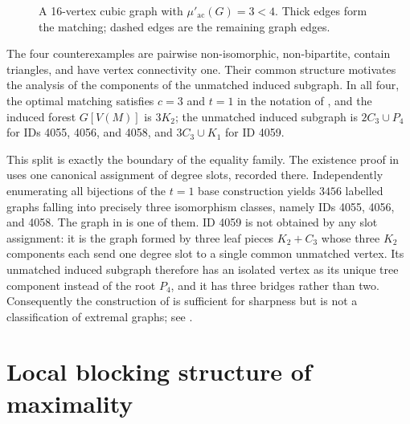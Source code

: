 \documentclass[smallextended,natbib,nospthms]{svjour3}
\theoremstyle{definition}
\theoremstyle{remark}
\newcommand{\acnum}{\mu'_{\mathrm{ac}}}
\begin{document}
\begin{figure}[t]
\centering
{}
\caption{A 16-vertex cubic graph with $\acnum(G)=3<4$. Thick edges form the
matching; dashed edges are the remaining graph edges.}
\label{fig:n16}
\end{figure}

The four counterexamples are pairwise non-isomorphic, non-bipartite, contain
triangles, and have vertex connectivity one. Their common structure motivates
the analysis of the components of the unmatched induced subgraph. In all four,
the optimal matching satisfies $c=3$ and $t=1$ in the notation of
, and the induced forest $G[V(M)]$ is $3K_2$; the
unmatched induced subgraph is $2C_3\cup P_4$ for IDs 4055, 4056, and 4058, and
$3C_3\cup K_1$ for ID 4059.

This split is exactly the boundary of the equality family. The existence
proof in  uses one canonical assignment of degree
slots, recorded there. Independently enumerating all bijections of the
$t=1$ base construction yields $3456$ labelled graphs falling into precisely
three isomorphism classes, namely IDs 4055, 4056, and 4058. The graph in
 is one of them. ID 4059 is not obtained by any slot
assignment: it is the graph formed by three leaf pieces $K_2+C_3$ whose three
$K_2$ components each send one degree slot to a single common unmatched
vertex. Its unmatched induced subgraph therefore has an isolated vertex as
its unique tree component instead of the root $P_4$, and it has three bridges
rather than two. Consequently the construction of
 is sufficient for sharpness but is not a
classification of extremal graphs; see .

\section{Local blocking structure of maximality}
\label{sec:blocking}
\end{document}
